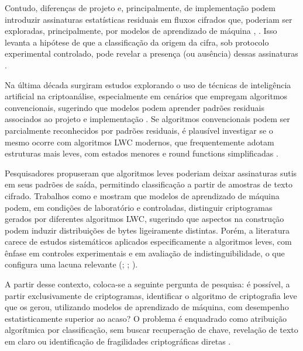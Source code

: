 Contudo, diferenças de projeto e, principalmente, de implementação podem introduzir assinaturas estatísticas residuais em fluxos cifrados que, poderiam ser exploradas, principalmente, por modelos de aprendizado de máquina \cite{Rukhin2010NIST80022}, \cite{Ahmadzadeh2022EncryptedTraffic}. Isso levanta a hipótese de que a classificação da origem da cifra, sob protocolo experimental controlado, pode revelar a presença (ou ausência) dessas assinaturas \cite{Turan2023NISTLWCFinal}.

Na última década surgiram estudos explorando o uso de técnicas de inteligência artificial na criptoanálise, especialmente em cenários que empregam algoritmos convencionais, sugerindo que modelos podem aprender padrões residuais associados ao projeto e implementação \cite{Ahmadzadeh2022EncryptedTraffic}. Se algoritmos convencionais podem ser parcialmente reconhecidos por padrões residuais, é plausível investigar se o mesmo ocorre com algoritmos LWC modernos, que frequentemente adotam estruturas mais leves, com estados menores e round functions simplificadas \cite{Shen2024LWCSurvey}.

Pesquisadores propuseram que algoritmos leves poderiam deixar assinaturas sutis em seus padrões de saída, permitindo classificação a partir de amostras de texto cifrado. Trabalhos como \cite{Yuan2023HRFLR} e \cite{Kopal2020CiphersNeurons} mostram que modelos de aprendizado de máquina podem, em condições de laboratório e controladas, distinguir criptogramas gerados por diferentes algoritmos LWC, sugerindo que aspectos na construção podem induzir distribuições de bytes ligeiramente distintas.
Porém, a literatura carece de estudos sistemáticos aplicados especificamente a algoritmos leves, com ênfase em controles experimentais e em avaliação de indistinguibilidade, o que configura uma lacuna relevante (\cite{Yuan2023HRFLR}; \cite{Kopal2020CiphersNeurons}; \cite{Leierzopf2021MassiveMLCipherType}).

A partir desse contexto, coloca-se a seguinte pergunta de pesquisa: é possível, a partir exclusivamente de criptogramas, identificar o algoritmo de criptografia leve que os gerou, utilizando modelos de aprendizado de máquina, com desempenho estatisticamente superior ao acaso? O problema é enquadrado como atribuição algorítmica por classificação, sem buscar recuperação de chave, revelação de texto em claro ou identificação de fragilidades criptográficas diretas \cite{Turan2023NISTLWCFinal}.

